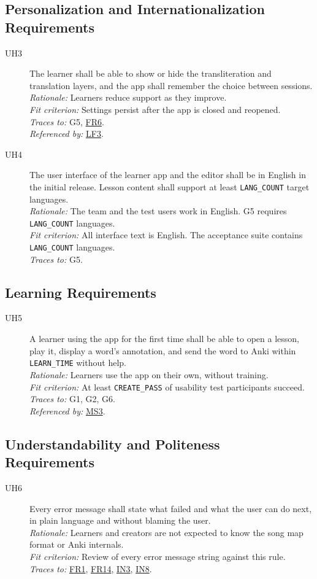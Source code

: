\documentclass[12pt]{article}
\newcommand{\cn}[1]{\texttt{#1}}
\newcommand{\rat}[1]{\\\textit{Rationale:} #1}
\newcommand{\fit}[1]{\\\textit{Fit criterion:} #1}
\newcommand{\trace}[1]{\\\textit{Traces to:} #1}
\newcommand{\usedby}[1]{\\\textit{Referenced by:} #1}
\newcommand{\reqdef}[1]{\hypertarget{req:#1}{#1}}
\newcommand{\req}[1]{\hyperlink{req:#1}{#1}}
\begin{document}
\subsection{Personalization and Internationalization Requirements}
\begin{description}
\item[\reqdef{UH3}] The learner shall be able to show or hide the transliteration and
translation layers, and the app shall remember the choice between sessions.
\rat{Learners reduce support as they improve.}
\fit{Settings persist after the app is closed and reopened.}
\trace{G5, \req{FR6}.}
\usedby{\req{LF3}.}

\item[\reqdef{UH4}] The user interface of the learner app and the editor shall be in
English in the initial release. Lesson content shall support at least
\cn{LANG\_COUNT} target languages.
\rat{The team and the test users work in English. G5 requires
\cn{LANG\_COUNT} languages.}
\fit{All interface text is English. The acceptance suite contains
\cn{LANG\_COUNT} languages.}
\trace{G5.}
\end{description}

\subsection{Learning Requirements}
\begin{description}
\item[\reqdef{UH5}] A learner using the app for the first time shall be able to open a lesson, play it,
display a word's annotation, and send the word to Anki within
\cn{LEARN\_TIME} without help.
\rat{Learners use the app on their own, without training.}
\fit{At least \cn{CREATE\_PASS} of usability test participants succeed.}
\trace{G1, G2, G6.}
\usedby{\req{MS3}.}
\end{description}

\subsection{Understandability and Politeness Requirements}
\begin{description}
\item[\reqdef{UH6}] Every error message shall state what failed and what the user can
do next, in plain language and without blaming the user.
\rat{Learners and creators are not expected to know the song map format or
Anki internals.}
\fit{Review of every error message string against this rule.}
\trace{\req{FR1}, \req{FR14}, \req{IN3}, \req{IN8}.}
\end{description}
\end{document}
